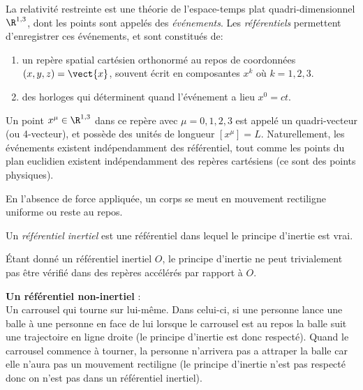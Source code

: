 {La relativité restreinte est une théorie de l'espace-temps plat quadri-dimensionnel $\R ^{1,3}$, dont les points sont appelés des \emph{événements}. Les \emph{référentiels} permettent d'enregistrer ces événements, et sont constitués de:
\begin{enumerate}
    \item un repère spatial cartésien orthonormé au repos de coordonnées $(x, y, z) = \vect{x}$, souvent écrit en composantes $x^k$ où $k=1, 2, 3$. 
    \item des horloges qui déterminent quand l'événement a lieu $x^0 = ct$. \\
\end{enumerate}
Un point $x^\mu\in \R^{1,3}$ dans ce repère avec $\mu=0,1,2,3$ est appelé un quadri-vecteur (ou 4-vecteur), et possède des unités de longueur $[x^\mu ] = L$. Naturellement, les événements existent indépendamment des référentiel, tout comme les points du plan euclidien existent indépendamment des repères cartésiens (ce sont des points physiques).
\begin{theoremframe}
\begin{rap}
    En l'absence de force appliquée, un corps se meut en mouvement rectiligne uniforme ou reste au repos.    
\end{rap}
\end{theoremframe}
\begin{theoremframe}
\begin{defi}
Un \emph{référentiel inertiel} est une référentiel dans lequel le principe d'inertie est vrai. 
\end{defi}
\end{theoremframe}
Étant donné un référentiel inertiel $O$, le principe d'inertie ne peut trivialement pas être vérifié dans des repères accélérés par rapport à $O$. 

\begin{exmp}
    \textbf{Un référentiel non-inertiel} :\\
    Un carrousel qui tourne sur lui-même. Dans celui-ci, si une personne lance une balle à une personne en face de lui lorsque le carrousel est au repos la balle suit une trajectoire en ligne droite (le principe d'inertie est donc respecté). Quand le carrousel commence à tourner, la personne n'arrivera pas a attraper la balle car elle n'aura pas un mouvement rectiligne (le principe d'inertie n'est pas respecté donc on n'est pas dans un référentiel inertiel).
\end{exmp}


}
